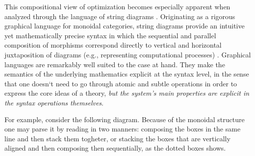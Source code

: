 This compositional view of optimization becomes especially apparent when analyzed through
the language of string diagrams \cite{joyal1991geometry, selinger2010survey, piedeleu2023introductionstringdiagramscomputer}.
Originating as a rigorous graphical language for
monoidal categories, string diagrams provide an intuitive yet mathematically
precise syntax in which the sequential and parallel composition of morphisms
correspond directly to vertical and horizontal juxtaposition of diagrams
(e.g., representing computational processes)
\cite{joyal1991geometry, maclane1998categories}.
Graphical languages are remarkably well suited to the case at hand.
They make the semantics of the underlying mathematics explicit at the syntax level,
in the sense that one doesn`t need to go through atomic and subtle operations in order
to express the core ideas of a theory,
\textit{but the system's main properties are explicit in the syntax operations themselves}.

For example, consider the following diagram. Because of the monoidal structure
one may parse it by reading in two manners: composing the boxes in the same line
and then stack them togheter, or stacking the boxes that are vertically aligned 
and then composing then sequentially, as the dotted boxes shows.

